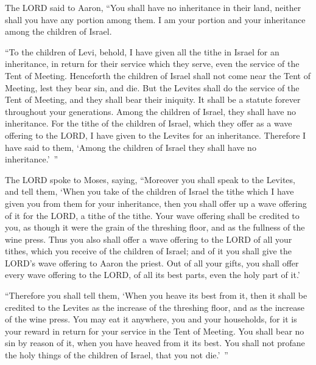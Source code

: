 \myverse{}The LORD said to Aaron, “You shall have no inheritance in their
land, neither shall you have any portion among them. I am your portion and your inheritance among the
children of Israel.


\myverse{}“To the children of Levi, behold, I have given all the tithe
in Israel for an inheritance, in return for their service which they serve, even the service of the Tent
of Meeting.
\myverse{}Henceforth the children of Israel shall not come near the Tent of Meeting,
lest they bear sin, and die.
\myverse{}But the Levites shall do the service of the Tent of Meeting, and they shall
bear their iniquity. It shall be a statute forever throughout your generations. Among the children of
Israel, they shall have no inheritance.
\myverse{}For the tithe of the children of Israel, which they offer as a wave offering
to the LORD, I have given to the Levites for an inheritance. Therefore I have said to them, ‘Among the
children of Israel they shall have no inheritance.’ ”


\myverse{}The LORD spoke to Moses, saying,
\myverse{}“Moreover you shall speak to the Levites, and tell them, ‘When you take of
the children of Israel the tithe which I have given you from them for your inheritance, then you shall
offer up a wave offering of it for the LORD, a tithe of the tithe.
\myverse{}Your wave offering shall be credited to you, as though it were the grain
of the threshing floor, and as the fullness of the wine press.
\myverse{}Thus you also shall offer a wave offering to the LORD of all your tithes,
which you receive of the children of Israel; and of it you shall give the LORD’s wave offering to Aaron
the priest.
\myverse{}Out of all your gifts, you shall offer every wave offering to the LORD, of
all its best parts, even the holy part of it.’


\myverse{}“Therefore you shall tell them, ‘When you heave its best from
it, then it shall be credited to the Levites as the increase of the threshing floor, and as the increase
of the wine press.
\myverse{}You may eat it anywhere, you and your households, for it is your reward in
return for your service in the Tent of Meeting.
\myverse{}You shall bear no sin by reason of it, when you have heaved from it its best.
You shall not profane the holy things of the children of Israel, that you not die.’ ”


